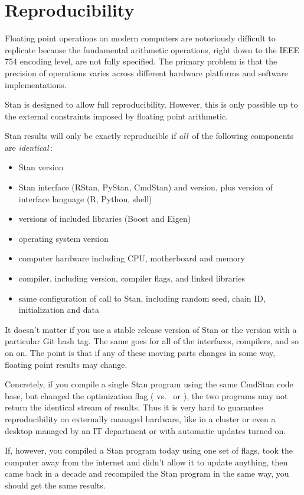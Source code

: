 \chapter{Reproducibility}\label{reproducibility.chapter}

\noindent
Floating point operations on modern computers are notoriously
difficult to replicate because the fundamental arithmetic operations,
right down to the IEEE 754 encoding level, are not fully specified.
The primary problem is that the precision of operations varies across
different hardware platforms and software implementations.

Stan is designed to allow full reproducibility.  However, this is only
possible up to the external constraints imposed by floating point
arithmetic.

Stan results will only be exactly reproducible if {\it all}\, of the following
components are {\it identical}\,:
%
\begin{itemize}
\item Stan version
\item Stan interface (RStan, PyStan, CmdStan) and version, plus version
  of interface language (R, Python, shell)
\item versions of included libraries (Boost and Eigen)
\item operating system version
\item computer hardware including CPU, motherboard and memory
\item \Cpp compiler, including version, compiler flags, and linked libraries
\item same configuration of call to Stan, including random seed, chain
  ID, initialization and data
\end{itemize}
%
It doesn't matter if you use a stable release version of Stan or the
version with a particular Git hash tag.  The same goes for all of the
interfaces, compilers, and so on on.  The point is that if any of
these moving parts changes in some way, floating point results may
change.

Concretely, if you compile a single Stan program using the same
CmdStan code base, but changed the optimization flag ( vs.\
 or ), the two programs may not return the identical
stream of results.  Thus it is very hard to guarantee reproducibility
on externally managed hardware, like in a cluster or even a desktop
managed by an IT department or with automatic updates turned on.

If, however, you compiled a Stan program today using one set of flags,
took the computer away from the internet and didn't allow it to update
anything, then came back in a decade and recompiled the Stan program
in the same way, you should get the same results.

